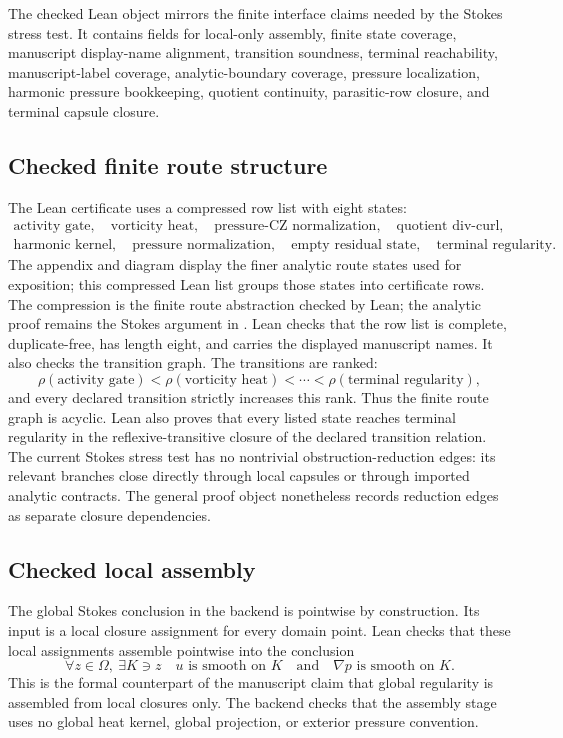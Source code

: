 \documentclass[11pt]{article}
\theoremstyle{plain}
\theoremstyle{definition}
\theoremstyle{remark}
\begin{document}
The checked Lean object mirrors the finite interface claims needed by the
Stokes stress test.  It contains fields for local-only assembly, finite state
coverage, manuscript display-name alignment, transition soundness, terminal
reachability, manuscript-label coverage, analytic-boundary coverage, pressure
localization, harmonic pressure bookkeeping, quotient continuity,
parasitic-row closure, and terminal capsule closure.

\subsection{Checked finite route structure}
The Lean certificate uses a compressed row list with eight states:
\[
\begin{gathered}
  \text{activity gate},\quad
  \text{vorticity heat},\quad
  \text{pressure-CZ normalization},\quad
  \text{quotient div-curl},\\
  \text{harmonic kernel},\quad
  \text{pressure normalization},\quad
  \text{empty residual state},\quad
  \text{terminal regularity}.
\end{gathered}
\]
The appendix and diagram display the finer analytic route states used for
exposition; this compressed Lean list groups those states into certificate rows.
The compression is the finite route abstraction checked by Lean; the analytic
proof remains the Stokes argument in .
Lean checks that the row list is complete, duplicate-free, has length eight,
and carries the displayed manuscript names.  It also checks the transition
graph.  The transitions are ranked:
\[
  \rho(\text{activity gate})<\rho(\text{vorticity heat})<
  \cdots <\rho(\text{terminal regularity}),
\]
and every declared transition strictly increases this rank.  Thus the finite
route graph is acyclic.  Lean also proves that every listed state reaches
terminal regularity in the reflexive-transitive closure of the declared
transition relation.  The current Stokes stress test has no nontrivial
obstruction-reduction edges: its relevant branches close directly through local
capsules or through imported analytic contracts.  The general proof object
nonetheless records reduction edges as separate closure dependencies.

\subsection{Checked local assembly}
The global Stokes conclusion in the backend is pointwise by construction.  Its
input is a local closure assignment for every domain point.  Lean checks that
these local assignments assemble pointwise into the conclusion
\[
  \forall z\in\Omega,\ \exists K\ni z
  \quad u\text{ is smooth on }K
  \quad\text{and}\quad \nabla p\text{ is smooth on }K.
\]
This is the formal counterpart of the manuscript claim that global regularity
is assembled from local closures only.  The backend checks that the assembly
stage uses no global heat kernel, global projection, or exterior pressure
convention.
\end{document}
